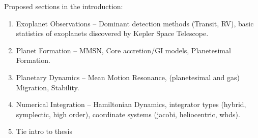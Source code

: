 \documentclass[12pt,letter]{aastex}
\date{Draft version: \today}
\begin{document}
Proposed sections in the introduction:
\begin{enumerate}
\item Exoplanet Observations -- Dominant detection methods (Transit, RV), basic statistics of exoplanets discovered by Kepler Space Telescope.
\item Planet Formation -- MMSN, Core accretion/GI models, Planetesimal Formation. 
\item Planetary Dynamics -- Mean Motion Resonance, (planetesimal and gas) Migration, Stability.
\item Numerical Integration -- Hamiltonian Dynamics, integrator types (hybrid, symplectic, high order), coordinate systems (jacobi, heliocentric, whds).
\item Tie intro to thesis
\end{enumerate}





\end{document}
